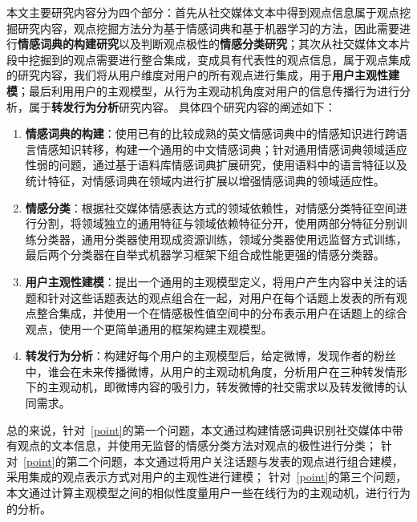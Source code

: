 本文主要研究内容分为四个部分：首先从社交媒体文本中得到观点信息属于观点挖掘研究内容，观点挖掘方法分为基于情感词典和基于机器学习的方法，因此需要进行\textbf{情感词典的构建研究}以及判断观点极性的\textbf{情感分类研究}；其次从社交媒体文本片段中挖掘到的观点需要进行整合集成，变成具有代表性的观点信息，属于观点集成的研究内容，我们将从用户维度对用户的所有观点进行集成，用于\textbf{用户主观性建模}；最后利用用户的主观模型，从行为主观动机角度对用户的信息传播行为进行分析，属于\textbf{转发行为分析}研究内容。
具体四个研究内容的阐述如下：

\begin{enumerate}
\item \textbf{情感词典的构建}：使用已有的比较成熟的英文情感词典中的情感知识进行跨语言情感知识转移，构建一个通用的中文情感词典；针对通用情感词典领域适应性弱的问题，通过基于语料库情感词典扩展研究，使用语料中的语言特征以及统计特征，对情感词典在领域内进行扩展以增强情感词典的领域适应性。
\item \textbf{情感分类}：根据社交媒体情感表达方式的领域依赖性，对情感分类特征空间进行分割，将领域独立的通用特征与领域依赖特征分开，使用两部分特征分别训练分类器，通用分类器使用现成资源训练，领域分类器使用远监督方式训练，最后两个分类器在自举式机器学习框架下组合成性能更强的情感分类器。
\item \textbf{用户主观性建模}：提出一个通用的主观模型定义，将用户产生内容中关注的话题和针对这些话题表达的观点组合在一起，对用户在每个话题上发表的所有观点整合集成，并使用一个在情感极性值空间中的分布表示用户在话题上的综合观点，使用一个更简单通用的框架构建主观模型。
\item \textbf{转发行为分析}：构建好每个用户的主观模型后，给定微博，发现作者的粉丝中，谁会在未来传播微博，从用户的主观动机角度，分析用户在三种转发情形下的主观动机，即微博内容的吸引力，转发微博的社交需求以及转发微博的认同需求。
\end{enumerate}

总的来说，针对~\ref{point}的第一个问题，本文通过构建情感词典识别社交媒体中带有观点的文本信息，并使用无监督的情感分类方法对观点的极性进行分类；
针对~\ref{point}的第二个问题，本文通过将用户关注话题与发表的观点进行组合建模，采用集成的观点表示方式对用户的主观性进行建模；
针对~\ref{point}的第三个问题，本文通过计算主观模型之间的相似性度量用户一些在线行为的主观动机，进行行为的分析。

